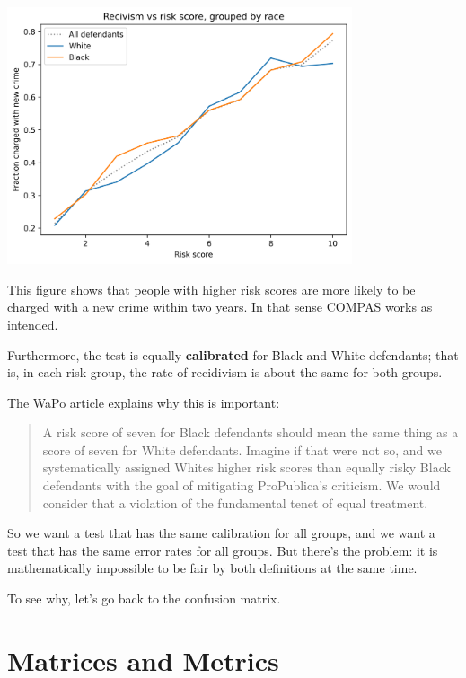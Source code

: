 \begin{center}
\includegraphics[width=4in]{chapters/02_calibration_files/02_calibration_20_0.png}
\end{center}

This figure shows that people with higher risk scores are more likely to
be charged with a new crime within two years. In that sense COMPAS works
as intended.

Furthermore, the test is equally \textbf{calibrated} for Black and White
defendants; that is, in each risk group, the rate of recidivism is about
the same for both groups.

The WaPo article explains why this is important:

\begin{quote}
A risk score of seven for Black defendants should mean the same thing as
a score of seven for White defendants. Imagine if that were not so, and
we systematically assigned Whites higher risk scores than equally risky
Black defendants with the goal of mitigating ProPublica's criticism. We
would consider that a violation of the fundamental tenet of equal
treatment.
\end{quote}

So we want a test that has the same calibration for all groups, and we
want a test that has the same error rates for all groups. But there's
the problem: it is mathematically impossible to be fair by both
definitions at the same time.

To see why, let's go back to the confusion matrix.

\hypertarget{matrices-and-metrics}{%
\section{Matrices and Metrics}\label{matrices-and-metrics}}

